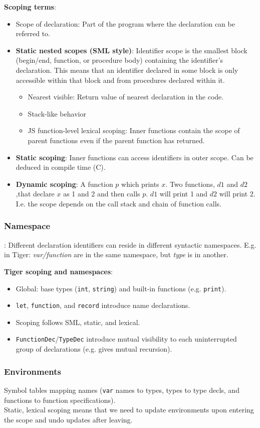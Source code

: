 \textbf{Scoping terms}:

\begin{itemize}
    \item Scope of declaration: Part of the program where the declaration can be referred to.
    \item \textbf{Static nested scopes (SML style)}: Identifier scope is the smallest block (begin/end, function, or procedure body) containing the identifier's declaration. This means that an identifier declared in some block is only accessible within that block and from procedures declared within it.
    \begin{itemize}
        \item Nearest visible: Return value of nearest declaration in the code.
        \item Stack-like behavior
        \item JS function-level lexical scoping: Inner functions contain the scope of parent functions even if the parent function has returned.
    \end{itemize}
    \item \textbf{Static scoping}: Inner functions can access identifiers in outer scope. Can be deduced in compile time (C).
    \item \textbf{Dynamic scoping}: A function $p$ which prints $x$. Two functions, $d1$ and $d2$,that declare $x$ as 1 and 2 and then calls $p$. $d1$ will print 1 and $d2$ will print 2. I.e. the scope depends on the call stack and chain of function calls.
\end{itemize}

\subsubsection{Namespace}: Different declaration identifiers can reside in different syntactic namespaces. E.g. in Tiger: \textit{var/function} are in the same namespace, but \textit{type} is in another.

\textbf{Tiger scoping and namespaces}:
\begin{itemize}
    \item Global: base types (\texttt{int}, \texttt{string}) and built-in functions (e.g. \texttt{print}).
    \item \texttt{let}, \texttt{function}, and \texttt{record} introduce name declarations.
    \item Scoping follows SML, static, and lexical.
    \item \texttt{FunctionDec}/\texttt{TypeDec} introduce mutual visibility to each uninterrupted group of declarations (e.g. gives mutual recursion).
\end{itemize}

\subsubsection{Environments}

Symbol tables mapping names (\texttt{var} names to types, types to type decls, and functions to function specifications).\\

Static, lexical scoping means that we need to update environments upon entering the scope and undo updates after leaving.


